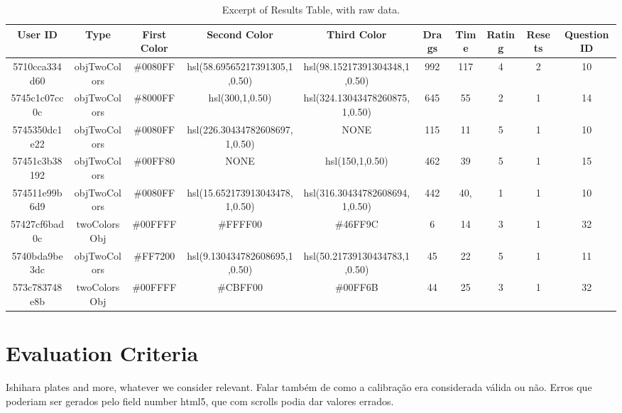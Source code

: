 \begin{table}[htbp]
  \resizebox{\textwidth}{!} {
  \begin{tabular} {|c|c|c|c|c|c|c|c|c|c|}
    \hline
    User ID & Type & First Color & Second Color & Third Color & Drags & Time & Rating & Resets & Question ID \\ \hline \hline
    5710cca334d60 & objTwoColors & \#0080FF & hsl(58.69565217391305,1,0.50) & hsl(98.15217391304348,1,0.50) & 992 & 117 & 4 & 2 & 10 \\ \hline
    5745c1c07cc0c & objTwoColors & \#8000FF & hsl(300,1,0.50) & hsl(324.13043478260875,1,0.50) & 645 & 55 & 2 & 1 & 14 \\ \hline
    5745350dc1e22 & objTwoColors & \#0080FF & hsl(226.30434782608697,1,0.50) & NONE & 115 & 11 & 5 & 1 & 10 \\ \hline
    57451c3b38192 & objTwoColors & \#00FF80 & NONE & hsl(150,1,0.50) & 462 & 39 & 5 & 1 & 15 \\ \hline
    574511e99b6d9 & objTwoColors & \#0080FF & hsl(15.652173913043478,1,0.50) & hsl(316.30434782608694,1,0.50) & 442 & 40, & 1 & 1 & 10 \\ \hline
    57427cf6bad0c & twoColorsObj & \#00FFFF & \#FFFF00 & \#46FF9C & 6 & 14 & 3 & 1 & 32 \\ \hline
    5740bda9be3dc & objTwoColors & \#FF7200 & hsl(9.130434782608695,1,0.50) & hsl(50.21739130434783,1,0.50) & 45 & 22 & 5 & 1 & 11 \\ \hline
    573c783748e8b & twoColorsObj & \#00FFFF & \#CBFF00 & \#00FF6B & 44 & 25 & 3 & 1 & 32 \\
    \hline
  \end{tabular}}
  \caption[Excerpt of Raw "Results" Table]{Excerpt of Results Table, with raw data.}
  \label{table:csv_resultsraw}
\end{table} \par
%

%
\section{Evaluation Criteria}
\label{sec:impl_evaluationcriteria}
Ishihara plates and more, whatever we consider relevant. Falar também de como a calibração era considerada válida ou não. Erros
que poderiam ser gerados pelo field number html5, que com scrolls podia dar valores errados. \\
